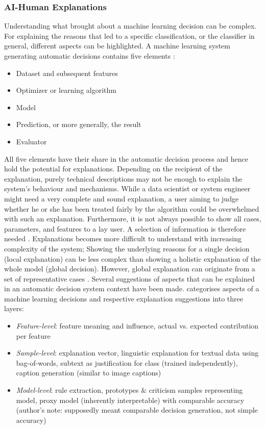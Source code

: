 \subsubsection{AI-Human Explanations}
Understanding what brought about a machine learning decision can be complex. For explaining the reasons that led to a specific classification, or the classifier in general, different aspects can be highlighted.\newline
A machine learning system generating automatic decisions contains five elements \cite{ventocilla2018taxonomy}:
\begin{itemize}
	\item Dataset and subsequent features
	\item Optimizer or learning algorithm
	\item Model 
	\item Prediction, or more generally, the result
	\item Evaluator
\end{itemize}
All five elements have their share in the automatic decision process and hence hold the potential for explanations. Depending on the recipient of the explanation, purely technical descriptions may not be enough to explain the system's behaviour and mechanisms. While a data scientist or system engineer might need a very complete and sound explanation, a user aiming to judge whether he or she has been treated fairly by the algorithm could be overwhelmed with such an explanation. Furthermore, it is not always possible to show all cases, parameters, and features to a lay user. A selection of information is therefore needed \cite{ribeiro2016should}. Explanations becomes more difficult to understand with increasing complexity of the system; Showing the underlying reasons for a single decision (local explanation) can be less complex than showing a holistic explanation of the whole model (global decision). However, global explanation can originate from a set of representative cases \cite{ribeiro2016should}.\newline
Several suggestions of aspects that can be explained in an automatic decision system context have been made. \cite{biran2017explanation} categorises aspects of a machine learning decisions and respective explanation suggestions into three layers:
\begin{itemize}
	\item \textit{Feature-level}: feature meaning and influence, actual vs. expected contribution per feature
	\item \textit{Sample-level}: explanation vector, linguistic explanation for textual data using bag-of-words, subtext as justification for class (trained independently), caption generation (similar to image captions) 
	\item \textit{Model-level}: rule extraction, prototypes \& criticism samples representing model, proxy model (inherently interpretable) with comparable accuracy (author's note: supposedly meant comparable decision generation, not simple accuracy)
\end{itemize}
